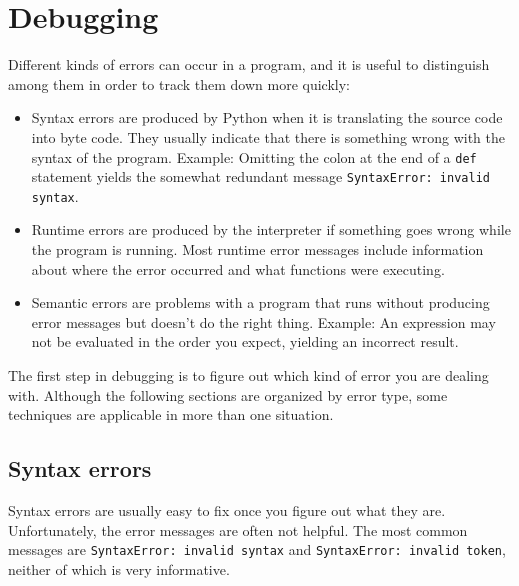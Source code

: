 \documentclass[10pt]{book}
\begin{document}
% 

\appendix

\chapter{Debugging}

Different kinds of errors can occur
in a program, and it is useful to distinguish among them
in order to track them down more quickly:

\begin{itemize}

\item Syntax errors are produced by Python when it is translating the
  source code into byte code.  They usually indicate that there is
  something wrong with the syntax of the program.  Example: Omitting
  the colon at the end of a {\tt def} statement yields the somewhat
  redundant message {\tt SyntaxError: invalid syntax}.

\item Runtime errors are produced by the interpreter if something goes
  wrong while the program is running.  Most runtime error messages
  include information about where the error occurred and what
  functions were executing.  

\item Semantic errors are problems with a program that runs without
  producing error messages but doesn't do the right thing.  Example:
  An expression may not be evaluated in the order you expect, yielding
  an incorrect result.

\end{itemize}


The first step in debugging is to figure out which kind of
error you are dealing with.  Although the following sections are
organized by error type, some techniques are
applicable in more than one situation.


\section{Syntax errors}


Syntax errors are usually easy to fix once you figure out what they
are.  Unfortunately, the error messages are often not helpful.
The most common messages are {\tt SyntaxError: invalid syntax} and
{\tt SyntaxError: invalid token}, neither of which is very informative.
\end{document}
